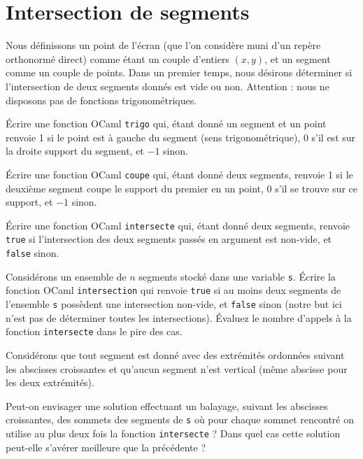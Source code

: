 \renewcommand{\SourceFile}{6-geometrie-et-images/src/6-6.ml}

\section{Intersection de segments}

Nous définissons un point de l'écran (que l'on considère muni d'un repère orthonormé direct) comme étant un couple d'entiers $(x,y)$, et un segment comme un couple de points. Dans un premier temps, nous désirons déterminer si l'intersection de deux segments donnés est vide ou non. Attention : nous ne disposons pas de fonctions trigonométriques.
\medskip

\Q
Écrire une fonction OCaml \texttt{trigo} qui, étant donné un segment et un point renvoie 1 si le point est à gauche du segment (sens trigonométrique), 0 s'il est sur la droite support du segment, et $-1$ sinon.

\Q
Écrire une fonction OCaml \texttt{coupe} qui, étant donné deux segments, renvoie 1 si le deuxième segment coupe le support du premier en un point, 0 s'il se trouve sur ce support, et $-1$ sinon.

\Q
Écrire une fonction OCaml \texttt{intersecte} qui, étant donné deux segments, renvoie \texttt{true} si l'intersection des deux segments passés en argument est non-vide, et \texttt{false} sinon.

\Q
Considérons un ensemble de $n$ segments stocké dans une variable \texttt{s}. Écrire la fonction OCaml \texttt{intersection} qui renvoie \texttt{true} si au moins deux segments de l'ensemble \texttt{s} possèdent une intersection non-vide, et \texttt{false} sinon (notre but ici n'est pas de déterminer toutes les intersections). Évaluez le nombre d'appels à la fonction \texttt{intersecte} dans le pire des cas.

\Q
Considérons que tout segment est donné avec des extrémités ordonnées suivant les abscisses croissantes et qu'aucun segment n'est vertical (même abscisse pour les deux extrémités).
\medskip

Peut-on envisager une solution effectuant un balayage, suivant les abscisses croissantes, des sommets des segments de \texttt{s} où pour chaque sommet rencontré on utilise au plus deux fois la fonction \texttt{intersecte} ? Dans quel cas cette solution peut-elle s'avérer meilleure que la précédente ?

\Corrige
\vspace{.6cm}

